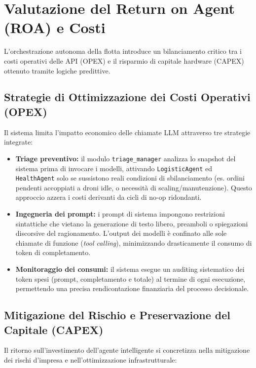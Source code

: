 \section{Valutazione del Return on Agent (ROA) e Costi}
\label{sec:roa}

L'orchestrazione autonoma della flotta introduce un bilanciamento critico tra i costi operativi delle API (OPEX) e il risparmio di capitale hardware (CAPEX) ottenuto tramite logiche predittive.

\subsection{Strategie di Ottimizzazione dei Costi Operativi (OPEX)}
Il sistema limita l'impatto economico delle chiamate LLM attraverso tre strategie integrate:

\begin{itemize}
    \item \textbf{Triage preventivo:} il modulo \texttt{triage\_manager} analizza lo snapshot del sistema prima di invocare i modelli, attivando \texttt{LogisticAgent} ed \texttt{HealthAgent} solo se sussistono reali condizioni di sbilanciamento (es. ordini pendenti accoppiati a droni idle, o necessità di scaling/manutenzione). Questo approccio azzera i costi derivanti da cicli di no-op ridondanti.
    \item \textbf{Ingegneria dei prompt:} i prompt di sistema impongono restrizioni sintattiche che vietano la generazione di testo libero, preamboli o spiegazioni discorsive del ragionamento. L'output dei modelli è confinato alle sole chiamate di funzione (\textit{tool calling}), minimizzando drasticamente il consumo di token di completamento.
    \item \textbf{Monitoraggio dei consumi:} il sistema esegue un auditing sistematico dei token spesi (prompt, completamento e totale) al termine di ogni esecuzione, permettendo una precisa rendicontazione finanziaria del processo decisionale.
\end{itemize}

\subsection{Mitigazione del Rischio e Preservazione del Capitale (CAPEX)}
Il ritorno sull'investimento dell'agente intelligente si concretizza nella mitigazione dei rischi d'impresa e nell'ottimizzazione infrastrutturale:

